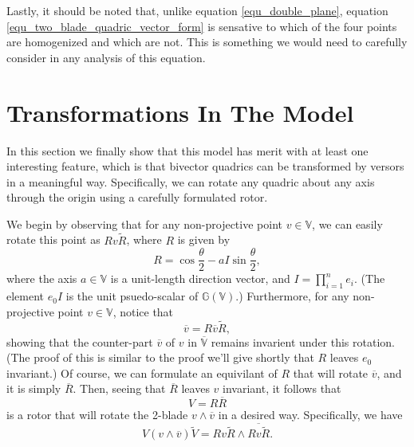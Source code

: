 \documentclass{birkjour}
\theoremstyle{definition}
\theoremstyle{remark}
\numberwithin{equation}{section}
\newcommand{\G}{\mathbb{G}}
\newcommand{\V}{\mathbb{V}}
\begin{document}
Lastly, it should be noted that, unlike equation \eqref{equ_double_plane},
equation \eqref{equ_two_blade_quadric_vector_form} is sensative to which
of the four points are homogenized and which are not.  This is something
we would need to carefully consider in any analysis of this equation.

\section{Transformations In The Model}

In this section we finally show that this model has merit with at least one
interesting feature, which is that bivector quadrics can be transformed by
versors in a meaningful way.  Specifically, we can rotate any quadric about
any axis through the origin using a carefully formulated rotor.

We begin by observing that for any non-projective point $v\in\V$,
we can easily rotate this point as $Rv\tilde{R}$, where $R$ is
given by
\begin{equation}
R = \cos\frac{\theta}{2} - aI\sin\frac{\theta}{2},
\end{equation}
where the axis $a\in\V$ is a unit-length direction vector, and $I=\prod_{i=1}^n e_i$.
(The element $e_0I$ is the unit psuedo-scalar of $\G(\V)$.)
Furthermore,
for any non-projective point $v\in\V$, notice that
\begin{equation}
\overline{v} = R\overline{v}\tilde{R},
\end{equation}
showing that the counter-part $\overline{v}$ of $v$ in $\overline{\V}$ remains invarient
under this rotation.  (The proof of this is similar to the proof we'll give
shortly that $R$ leaves $e_0$ invariant.)  Of course, we can formulate an equivilant of $R$
that will rotate $\overline{v}$, and it is simply $\overline{R}$.  Then, seeing
that $\overline{R}$ leaves $v$ invariant, it follows that
\begin{equation}\label{equ_rotation_versor}
V=R\overline{R}
\end{equation}
is a rotor that will rotate the 2-blade
$v\wedge\overline{v}$ in a desired way.  Specifically, we have
\begin{equation}
V(v\wedge\overline{v})\tilde{V} = Rv\tilde{R}\wedge\overline{Rv\tilde{R}}.
\end{equation}
\end{document}
